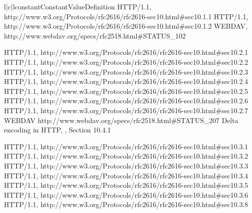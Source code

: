 \begin{tableiii}{l|c|l}{constant}{Constant}{Value}{Definition}
    {HTTP/1.1, 
      {http://www.w3.org/Protocols/rfc2616/rfc2616-sec10.html#sec10.1.1}}
    {HTTP/1.1, 
      {http://www.w3.org/Protocols/rfc2616/rfc2616-sec10.html#sec10.1.2}}
    {WEBDAV, 
      {http://www.webdav.org/specs/rfc2518.html#STATUS_102}}

    {HTTP/1.1, 
      {http://www.w3.org/Protocols/rfc2616/rfc2616-sec10.html#sec10.2.1}}
    {HTTP/1.1, 
      {http://www.w3.org/Protocols/rfc2616/rfc2616-sec10.html#sec10.2.2}}
    {HTTP/1.1, 
      {http://www.w3.org/Protocols/rfc2616/rfc2616-sec10.html#sec10.2.3}}
    {HTTP/1.1, 
      {http://www.w3.org/Protocols/rfc2616/rfc2616-sec10.html#sec10.2.4}}
    {HTTP/1.1, 
      {http://www.w3.org/Protocols/rfc2616/rfc2616-sec10.html#sec10.2.5}}
    {HTTP/1.1, 
      {http://www.w3.org/Protocols/rfc2616/rfc2616-sec10.html#sec10.2.6}}
    {HTTP/1.1, 
      {http://www.w3.org/Protocols/rfc2616/rfc2616-sec10.html#sec10.2.7}}
    {WEBDAV 
      {http://www.webdav.org/specs/rfc2518.html#STATUS_207}}
    {Delta encoding in HTTP, , Section 10.4.1}

    {HTTP/1.1, 
      {http://www.w3.org/Protocols/rfc2616/rfc2616-sec10.html#sec10.3.1}}
    {HTTP/1.1, 
      {http://www.w3.org/Protocols/rfc2616/rfc2616-sec10.html#sec10.3.2}}
    {HTTP/1.1, 
      {http://www.w3.org/Protocols/rfc2616/rfc2616-sec10.html#sec10.3.3}}
    {HTTP/1.1, 
      {http://www.w3.org/Protocols/rfc2616/rfc2616-sec10.html#sec10.3.4}}
    {HTTP/1.1, 
      {http://www.w3.org/Protocols/rfc2616/rfc2616-sec10.html#sec10.3.5}}
    {HTTP/1.1, 
      {http://www.w3.org/Protocols/rfc2616/rfc2616-sec10.html#sec10.3.6}}
    {HTTP/1.1, 
      {http://www.w3.org/Protocols/rfc2616/rfc2616-sec10.html#sec10.3.8}}


\end{tableiii}

